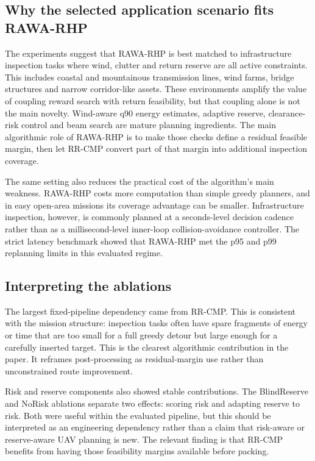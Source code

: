 \documentclass[preprint,12pt]{elsarticle}
\begin{document}
\subsection{Why the selected application scenario fits RAWA-RHP}

The experiments suggest that RAWA-RHP is best matched to infrastructure inspection tasks where wind, clutter and return reserve are all active constraints. This includes coastal and mountainous transmission lines, wind farms, bridge structures and narrow corridor-like assets. These environments amplify the value of coupling reward search with return feasibility, but that coupling alone is not the main novelty. Wind-aware q90 energy estimates, adaptive reserve, clearance-risk control and beam search are mature planning ingredients. The main algorithmic role of RAWA-RHP is to make those checks define a residual feasible margin, then let RR-CMP convert part of that margin into additional inspection coverage.

The same setting also reduces the practical cost of the algorithm's main weakness. RAWA-RHP costs more computation than simple greedy planners, and in easy open-area missions its coverage advantage can be smaller. Infrastructure inspection, however, is commonly planned at a seconds-level decision cadence rather than as a millisecond-level inner-loop collision-avoidance controller. The strict latency benchmark showed that RAWA-RHP met the p95 and p99 replanning limits in this evaluated regime.

\subsection{Interpreting the ablations}

The largest fixed-pipeline dependency came from RR-CMP. This is consistent with the mission structure: inspection tasks often have spare fragments of energy or time that are too small for a full greedy detour but large enough for a carefully inserted target. This is the clearest algorithmic contribution in the paper. It reframes post-processing as residual-margin use rather than unconstrained route improvement.

Risk and reserve components also showed stable contributions. The BlindReserve and NoRisk ablations separate two effects: scoring risk and adapting reserve to risk. Both were useful within the evaluated pipeline, but this should be interpreted as an engineering dependency rather than a claim that risk-aware or reserve-aware UAV planning is new. The relevant finding is that RR-CMP benefits from having those feasibility margins available before packing.
\end{document}

